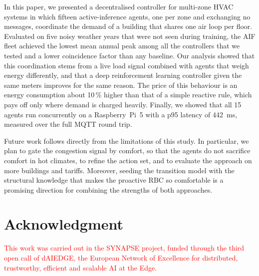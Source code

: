 \documentclass[conference]{IEEEtran}
\begin{document}
In this paper, we presented a decentralised controller for multi-zone HVAC
systems in which fifteen active-inference agents, one per zone and exchanging no
messages, coordinate the demand of a building that shares one air loop per
floor. Evaluated on five noisy weather years that were not seen during
training, the AIF fleet achieved the lowest mean annual peak among all the
controllers that we tested and a lower coincidence factor than any baseline.
Our analysis showed that this
coordination stems from a live load signal combined with agents that weigh
energy differently, and that a deep reinforcement learning controller given the
same meters improves for the same reason. The price of this behaviour is an
energy consumption about 10\,\% higher than that of a simple reactive rule,
which pays off only where demand is charged heavily. Finally, we showed that
all 15 agents run concurrently on a Raspberry~Pi~5 with a p95 latency of
\SI{442}{\milli\second}, measured over the full MQTT round trip.

Future work follows directly from the limitations of this study. In particular,
we plan to gate the congestion signal by comfort, so that the agents do not
sacrifice comfort in hot climates, to refine the action set, and to evaluate
the approach on more buildings and tariffs. Moreover, seeding the transition
model with the structural knowledge that makes the proactive RBC so comfortable
is a promising direction for combining the strengths of both approaches.

\section*{Acknowledgment}

\textcolor{red}{This work was carried out in the SYNAPSE project, funded through the third open
call of dAIEDGE, the European Network of Excellence for distributed,
trustworthy, efficient and scalable AI at the Edge.}



\end{document}
